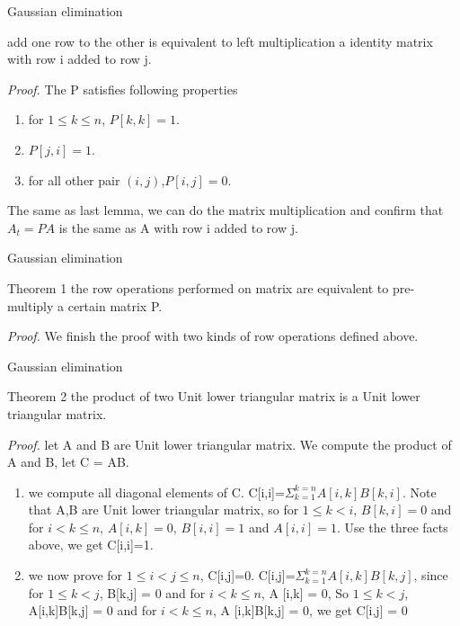 \documentclass[9pt]{beamer}
\newcommand{\ccb}[1]{{\color{blue}#1}}
\newcommand{\ccm}[1]{{\color{magenta}#1}}
\begin{document}
	\begin{frame}{Gaussian elimination}
		\begin{lemma}
			add one row to the other is equivalent to left multiplication a identity matrix with row i added to row j.
		\end{lemma}\pause
		\ccm{\em Proof.} The P satisfies following properties
		\begin{enumerate}
			\item for $1 \le k \le n$, $P[k,k]=1$.
			\item $P[j,i]=1$.
			\item for all other pair $(i,j)$,$P[i,j]=0$.
		\end{enumerate}
		The same as last lemma, we can do the matrix multiplication and confirm that \ccb{$A_t=PA$} is the same as A with row i added to row j.
	\end{frame}

	\begin{frame}{Gaussian elimination}
		\begin{block}{Theorem 1}
			the row operations performed on matrix are equivalent to pre-multiply a certain matrix P.
		\end{block}\pause
		\ccm{\em Proof.} We finish the proof with two kinds of row operations defined above.
	\end{frame}

	\begin{frame}{Gaussian elimination}
		\begin{block}{Theorem 2}
			the product of two Unit lower triangular matrix is a Unit lower triangular matrix.
		\end{block}\pause
		\ccm{\em Proof.} let A and B are Unit lower triangular matrix. We compute the product of A and B, let C = AB.
		\begin{enumerate}
			\item we compute all diagonal elements of C.
			C[i,i]=$\Sigma_{k=1}^{k=n}A[i,k]B[k,i]$. Note that A,B are Unit lower triangular matrix, so for $1 \le k < i$, $B[k,i] = 0$ and for $i < k \le n$, $A[i,k] = 0$, $B[i,i]=1$ and $A[i,i]= 1$. Use the three facts above, we get C[i,i]=1.
			\item we now prove for $1 \le i < j \le n$, C[i,j]=0.
			C[i,j]=$\Sigma_{k=1}^{k=n}A[i,k]B[k,j]$, since for $1 \le k < j$, B[k,j] = 0 and for $i < k \le n$, A [i,k] = 0, So $1 \le k < j$, A[i,k]B[k,j] = 0 and for $i < k \le n$, A [i,k]B[k,j] = 0, we get C[i,j] = 0
		\end{enumerate}
	\end{frame}
\end{document}
